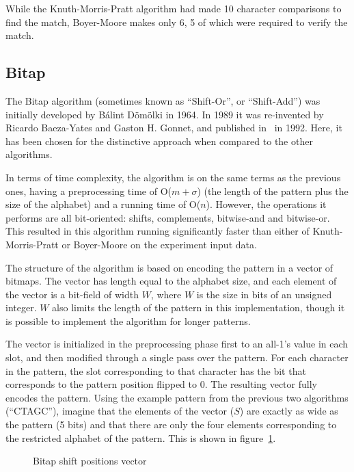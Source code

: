 While the Knuth-Morris-Pratt algorithm had made 10 character comparisons to find the match, Boyer-Moore makes only 6, 5 of which were required to verify the match.

\subsection{Bitap}

The Bitap algorithm (sometimes known as ``Shift-Or'', or ``Shift-Add'') was initially developed by B\'{a}lint D\"{o}m\"{o}lki in 1964. In 1989 it was re-invented by Ricardo Baeza-Yates and Gaston H. Gonnet, and published in~\cite{baeza} in 1992. Here, it has been chosen for the distinctive approach when compared to the other algorithms.

In terms of time complexity, the algorithm is on the same terms as the previous ones, having a preprocessing time of O($m+\sigma$) (the length of the pattern plus the size of the alphabet) and a running time of O($n$). However, the operations it performs are all bit-oriented: shifts, complements, bitwise-and and bitwise-or. This resulted in this algorithm running significantly faster than either of Knuth-Morris-Pratt or Boyer-Moore on the experiment input data.

The structure of the algorithm is based on encoding the pattern in a vector of bitmaps. The vector has length equal to the alphabet size, and each element of the vector is a bit-field of width $W$, where $W$ is the size in bits of an unsigned integer. $W$ also limits the length of the pattern in this implementation, though it is possible to implement the algorithm for longer patterns.

The vector is initialized in the preprocessing phase first to an all-1's value in each slot, and then modified through a single pass over the pattern. For each character in the pattern, the slot corresponding to that character has the bit that corresponds to the pattern position flipped to 0. The resulting vector fully encodes the pattern. Using the example pattern from the previous two algorithms (``CTAGC''), imagine that the elements of the vector ($S$) are exactly as wide as the pattern (5 bits) and that there are only the four elements corresponding to the restricted alphabet of the pattern. This is shown in figure~\ref{fig:bitap_s_positions}.

\begin{figure}[ht]
\centering

\caption{Bitap shift positions vector}
\label{fig:bitap_s_positions}
\end{figure}

